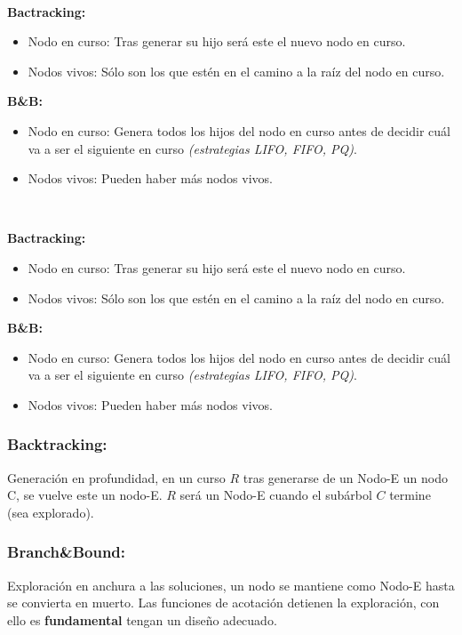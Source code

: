 \documentclass[tikz,11pt,fleqn]{book} %
\begin{document}
\begin{theorem}[Diferencias]~

    \textbf{Bactracking:}
    \begin{itemize}
        \item Nodo en curso: Tras generar su hijo será este el nuevo nodo en curso.
        \item Nodos vivos: Sólo son los que estén en el camino a la raíz del nodo en curso.
    \end{itemize}
    
    \textbf{B\&B:}
    \begin{itemize}
        \item Nodo en curso: Genera todos los hijos del nodo en curso antes de decidir cuál va a ser el siguiente en curso \textit{(estrategias LIFO, FIFO, PQ)}.
        \item Nodos vivos: Pueden haber más nodos vivos.
    \end{itemize}
\end{theorem}

\begin{theorem}[Diferencias]~

    \textbf{Bactracking:}
    \begin{itemize}
        \item Nodo en curso: Tras generar su hijo será este el nuevo nodo en curso.
        \item Nodos vivos: Sólo son los que estén en el camino a la raíz del nodo en curso.
    \end{itemize}
    
    \textbf{B\&B:}
    \begin{itemize}
        \item Nodo en curso: Genera todos los hijos del nodo en curso antes de decidir cuál va a ser el siguiente en curso \textit{(estrategias LIFO, FIFO, PQ)}.
        \item Nodos vivos: Pueden haber más nodos vivos.
    \end{itemize}
\end{theorem}

\subsubsection{Backtracking:}
Generación en profundidad, en un curso $R$ tras generarse de un Nodo-E un nodo C, se vuelve este un nodo-E.
$R$ será un Nodo-E cuando el subárbol $C$ termine (sea explorado). 

\subsubsection{Branch\&Bound:}
Exploración en anchura a las soluciones, un nodo se mantiene como Nodo-E hasta se convierta en muerto. Las funciones de acotación detienen la exploración, con ello es \textbf{fundamental} tengan un diseño adecuado.
\end{document}
